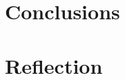 \documentclass[12pt]{article}
\begin{document}
\section{Conclusions}




\section{Reflection}









\pagebreak

\nocite{*}












\end{document}

